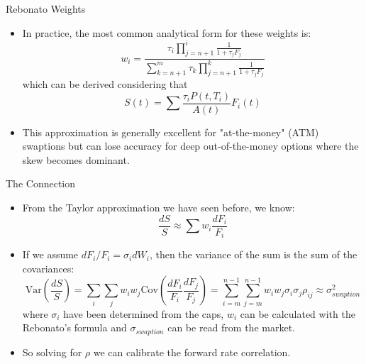 \documentclass{beamer}
\begin{document}
\begin{frame}{Rebonato Weights}
	\begin{itemize}
	\item In practice, the most common analytical form for these weights is:
	\begin{equation*}
		w_i=\frac{\tau_i \prod_{j=n+1}^{i}\frac{1}{1+\tau_j F_j}}{\sum_{k=n+1}^{m}\tau_k\prod_{j=n+1}^{k}\frac{1}{1+\tau_jF_j}}
	\end{equation*}
	which can be derived considering that
	\begin{equation*}
		S(t) = \sum\frac{\tau_iP(t, T_i)}{A(t)}F_i(t)
	\end{equation*}
	\item This approximation is generally excellent for "at-the-money" (ATM) swaptions but can lose accuracy for deep out-of-the-money options where the skew becomes dominant.

%
%
%
	\end{itemize}
\end{frame}

\begin{frame}{The Connection}
	\begin{itemize}
	\item From the Taylor approximation we have seen before, we know:
	\begin{equation*}
		\frac{dS}{S} \approx \sum w_i \frac{dF_i}{F_i}
	\end{equation*}
	\item If we assume $dF_i/F_i=\sigma_i dW_i$, then the variance of the sum is the sum of the covariances:
	\begin{equation*}
		\text{Var}\left(\frac{dS}{S}\right) = \sum_i \sum_j w_i w_j \text{Cov} \left(\frac{dF_i}{F_i}\frac{dF_j}{F_j}\right) =
		\sum_{i=m}^{n-1} \sum_{j=m}^{n-1} w_i w_j \sigma_i \sigma_j \rho_{ij} \approx \sigma_{swaption}^2
	\end{equation*}
	where $\sigma_i$ have been determined from the caps, $w_i$ can be calculated with the Rebonato's formula and $\sigma_{swaption}$ can be read from the market.
	\item So solving for $\rho$ we can calibrate the forward rate correlation.
	\end{itemize}
\end{frame}
\end{document}
